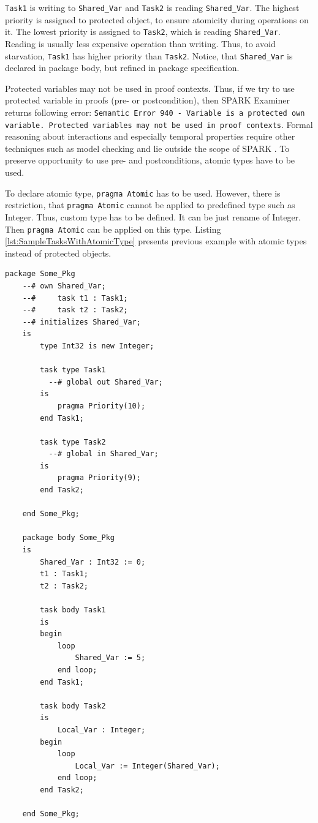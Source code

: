 \lstinline{Task1} is writing to \lstinline{Shared_Var} and \lstinline{Task2} is reading \lstinline{Shared_Var}. The highest priority is assigned to protected object, to ensure atomicity during operations on it. The lowest priority is assigned to \lstinline{Task2}, which is reading \lstinline{Shared_Var}. Reading is usually less expensive operation than writing. Thus, to avoid starvation, \lstinline{Task1} has higher priority than \lstinline{Task2}. Notice, that \lstinline{Shared_Var} is declared in package body, but refined in package specification.

Protected variables may not be used in proof contexts. Thus, if we try to use protected variable in proofs (pre- or postcondition), then SPARK Examiner returns following error: \lstinline{Semantic Error 940 - Variable is a protected own variable. Protected variables may not be used in proof contexts}. Formal reasoning about interactions and especially temporal properties require other techniques such as model checking and lie outside the scope of SPARK \cite{Barnes:Book}. To preserve opportunity to use pre- and postconditions, atomic types have to be used.

To declare atomic type, \lstinline{pragma Atomic} has to be used. However, there is restriction, that \lstinline{pragma Atomic} cannot be applied to predefined type such as Integer. Thus, custom type has to be defined. It can be just rename of Integer. Then \lstinline{pragma Atomic} can be applied on this type. Listing \ref{lst:SampleTasksWithAtomicType} presents previous example with atomic types instead of protected objects.

\singlespacing
\begin{lstlisting}[frame=single, gobble=0, caption={Sample tasks with atomic type}]
	package Some_Pkg
	--# own Shared_Var;
	--#     task t1 : Task1;
	--#     task t2 : Task2;
	--# initializes Shared_Var;
	is
	    type Int32 is new Integer;
	    
	    task type Task1
	      --# global out Shared_Var;
	    is
	        pragma Priority(10);
	    end Task1;

	    task type Task2
	      --# global in Shared_Var;
	    is
	        pragma Priority(9);
	    end Task2;

	end Some_Pkg;

	package body Some_Pkg
	is    
	    Shared_Var : Int32 := 0;
	    t1 : Task1;
	    t2 : Task2;

	    task body Task1
	    is
	    begin
	        loop
	            Shared_Var := 5;
	        end loop;
	    end Task1;

	    task body Task2
	    is
	        Local_Var : Integer;
	    begin
	        loop
	            Local_Var := Integer(Shared_Var);
	        end loop;
	    end Task2;

	end Some_Pkg;
\end{lstlisting}
\label{lst:SampleTasksWithAtomicType}
\doublespacing

